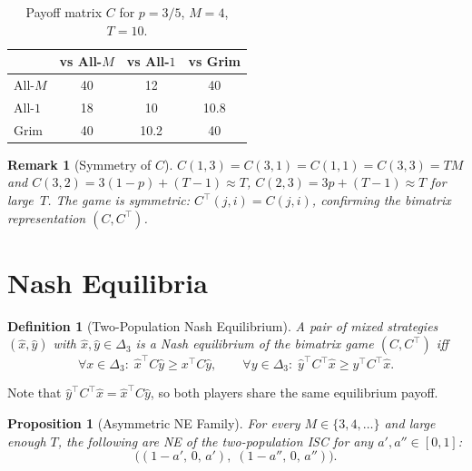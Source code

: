 \documentclass[12pt,a4paper]{article}
\newtheorem{definition}{Definition}[section]
\newtheorem{proposition}{Proposition}[section]
\newtheorem{remark}{Remark}[section]
\begin{document}
\begin{table}[H]
\centering
\caption{Payoff matrix $C$ for $p=3/5$, $M=4$, $T=10$.}
\label{tab:C_p060}
\renewcommand{\arraystretch}{1.2}
\begin{tabular}{lccc}
\toprule
           & vs All-$M$ & vs All-$1$ & vs Grim \\
\midrule
All-$M$    & 40 & 12  & 40    \\
All-$1$    & 18 & 10  & 10.8  \\
Grim       & 40 & 10.2 & 40   \\
\bottomrule
\end{tabular}
\end{table}

\begin{remark}[Symmetry of $C$]
$C(1,3)=C(3,1)=C(1,1)=C(3,3)=TM$ and $C(3,2)=3(1-p)+(T-1)\approx T$,
$C(2,3)=3p+(T-1)\approx T$ for large~$T$.  The game is symmetric:
$C^\top(j,i)=C(j,i)$, confirming the bimatrix representation $(C,C^\top)$.
\end{remark}

\section{Nash Equilibria}
\label{sec:NE}

\begin{definition}[Two-Population Nash Equilibrium]\label{def:NE}
A pair of mixed strategies $(\hat x, \hat y)$ with $\hat x,\hat y\in\Delta_3$
is a \emph{Nash equilibrium} of the bimatrix game $(C,C^\top)$ iff
\[
  \forall x\in\Delta_3:\; \hat x^\top C\hat y \geq x^\top C\hat y,\qquad
  \forall y\in\Delta_3:\; \hat y^\top C^\top\hat x \geq y^\top C^\top\hat x.
\]
\end{definition}

\noindent Note that $\hat y^\top C^\top\hat x = \hat x^\top C\hat y$, so both
players share the same equilibrium payoff.

\begin{proposition}[Asymmetric NE Family]\label{prop:NEfamily}
For every $M\in\{3,4,\ldots\}$ and large enough $T$, the following are NE of
the two-population ISC for any $a',a''\in[0,1]$:
\begin{equation}\label{eq:NEfamily}
  \bigl((1-a',\,0,\,a'),\;(1-a'',\,0,\,a'')\bigr).
\end{equation}
\end{proposition}
\end{document}
